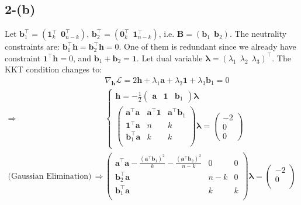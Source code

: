 \documentclass[11pt]{article}
\begin{document}
 \subsection*{2-(b)}
Let $\bm{b}_1^\top = (\bm{1}_k^{\top}~~ \bm{0}_{n-k}^{\top})$, $\bm{b}_2^\top = (\bm{0}_{k}^{\top}~~\bm{1}_{n-k}^{\top})$, i.e. $\bm{B} = (\bm{b}_1 ~~\bm{b}_2)$. The neutrality constraints are: $\bm{b}^{\top}_1 \bm{h} = \bm{b}^{\top}_2 \bm{h} = 0$. One of them is redundant since we already have constraint $\bm{1}^{\top} \bm{h}=0$, and $\bm{b}_1 + \bm{b}_2 = \bm{1}$. Let dual variable $\bm{\lambda} = (\lambda_1~~\lambda_2~~\lambda_3)^{\top}$. The KKT condition changes to:
\begin{equation}
  \begin{split}
    &\nabla_{\bm{h}} \mathcal{L} = 2 \bm{h} + \lambda_1 \bm{a} + \lambda_2 \bm{1} + \lambda_3 \bm{b}_1 = 0 \\
   \Rightarrow \quad &
   \begin{cases}
   \bm{h} = -\frac{1}{2} \begin{pmatrix}
     \bm{a} & \bm{1} & \bm{b}_1 
   \end{pmatrix} \bm{\lambda}\\
   \begin{pmatrix}
     \bm{a}^{\top} \bm{a} & \bm{a}^{\top} \bm{1} &  \bm{a}^{\top}\bm{b}_1  \\[1pt]
     \bm{1}^{\top} \bm{a} & n & k  \\[1pt]
     \bm{b}_1^{\top} \bm{a} & k & k  \\[1pt]
   \end{pmatrix} \bm{\lambda} = \begin{pmatrix}
     -2 \\
     0 \\
    0
   \end{pmatrix}
   \end{cases}\\
   \text{(Gaussian Elimination)}~~\Rightarrow \quad &\begin{pmatrix}
     \bm{a}^{\top} \bm{a} - \frac{(\bm{a}^{\top} \bm{b}_1)^2}{k}-\frac{(\bm{a}^{\top} \bm{b}_2)^2}{n-k} & 0 &  0  \\[1pt]
     \bm{b}_2^{\top} \bm{a} & n-k & 0  \\[1pt]
     \bm{b}_1^{\top} \bm{a} & k & k  \\[1pt]
   \end{pmatrix} \bm{\lambda} = \begin{pmatrix}
     -2 \\
     0 \\

\end{pmatrix}
\end{split}
\end{equation}
\end{document}
